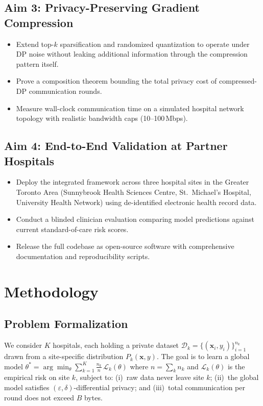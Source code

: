 \documentclass[11pt,a4paper]{article}
\begin{document}
{\subsection{Aim 3: Privacy-Preserving Gradient Compression}
\vspace{-2pt}
\begin{itemize}
  \item Extend top-$k$ sparsification and randomized quantization to operate under DP noise
    without leaking additional information through the compression pattern itself.
  \item Prove a composition theorem bounding the total privacy cost of compressed-DP
    communication rounds.
  \item Measure wall-clock communication time on a simulated hospital network topology
    with realistic bandwidth caps (10--100\,Mbps).
\end{itemize}

\subsection{Aim 4: End-to-End Validation at Partner Hospitals}
\vspace{-2pt}
\begin{itemize}
  \item Deploy the integrated framework across three hospital sites in the Greater Toronto
    Area (Sunnybrook Health Sciences Centre, St.\ Michael's Hospital, University Health
    Network) using de-identified electronic health record data.
  \item Conduct a blinded clinician evaluation comparing model predictions against current
    standard-of-care risk scores.
  \item Release the full codebase as open-source software with comprehensive documentation
    and reproducibility scripts.
\end{itemize}


\section{Methodology}

\subsection{Problem Formalization}

We consider $K$ hospitals, each holding a private dataset
$\mathcal{D}_k = \{(\mathbf{x}_i, y_i)\}_{i=1}^{n_k}$ drawn from a site-specific distribution
$P_k(\mathbf{x}, y)$. The goal is to learn a global model
$\theta^* = \arg\min_\theta \sum_{k=1}^{K} \frac{n_k}{n}\,\mathcal{L}_k(\theta)$ where
$n = \sum_k n_k$ and $\mathcal{L}_k(\theta)$ is the empirical risk on site $k$, subject to:
(i)~raw data never leave site $k$; (ii)~the global model satisfies
$(\varepsilon,\delta)$-differential privacy; and (iii)~total communication per round does
not exceed $B$ bytes.

}
\end{document}
